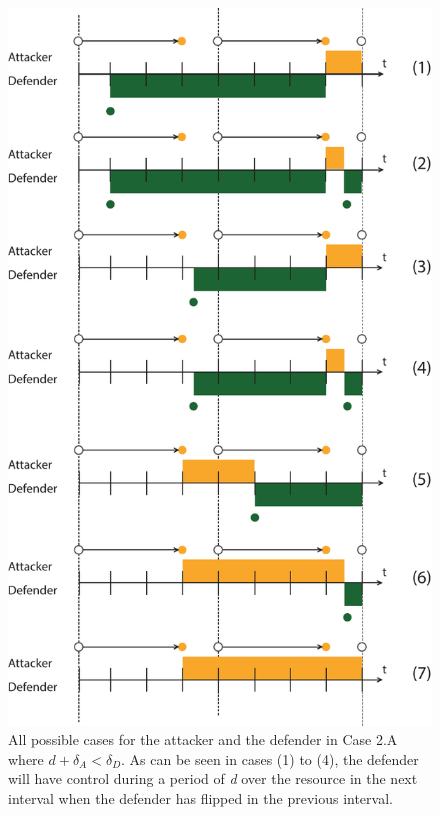 \begin{figure}[hbtp]
\centering
\includegraphics[scale=0.7]{../../doc/template/Images/FlipIt2.pdf}
\caption{All possible cases for the attacker and the defender in Case 2.A where $d + \delta_{A} < \delta_{D}$. As can be seen in cases (1) to (4), the defender will have control during a period of \textit{d} over the resource in the next interval when the defender has flipped in the previous interval.}
\label{fig:case2}
\end{figure}

